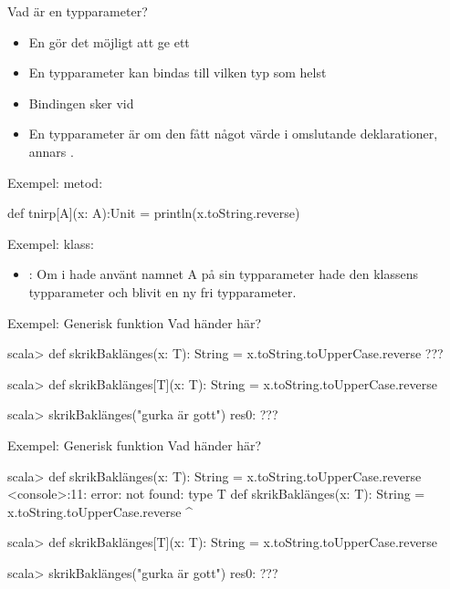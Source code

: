 \begin{Slide}{Vad är en typparameter?}\SlideFontSmall
\begin{itemize}
\item En  gör det möjligt att ge ett 
\item En  typparameter kan bindas till vilken typ som helst
\item Bindingen sker vid 
\item En typparameter är  om den  fått något värde i omslutande deklarationer, annars .
\end{itemize}
Exempel:  metod:
\begin{Code}
def tnirp[A](x: A):Unit = println(x.toString.reverse)
\end{Code}
\pause
Exempel:  klass:
\pause
\begin{itemize}
\item {}: Om  i  hade använt namnet A på sin typparameter hade den  klassens typparameter och blivit en ny fri typparameter.
\end{itemize}

\end{Slide}

\ifkompendium\else
\begin{Slide}{Exempel: Generisk funktion}
Vad händer här?
\begin{REPL}

scala> def skrikBaklänges(x: T): String = x.toString.toUpperCase.reverse
???



scala> def skrikBaklänges[T](x: T): String = x.toString.toUpperCase.reverse

scala> skrikBaklänges("gurka är gott")
res0: ???

\end{REPL}
\end{Slide}


\begin{Slide}{Exempel: Generisk funktion}
Vad händer här?
\begin{REPL}

scala> def skrikBaklänges(x: T): String = x.toString.toUpperCase.reverse
<console>:11: error: not found: type T
       def skrikBaklänges(x: T): String = x.toString.toUpperCase.reverse
                             ^

scala> def skrikBaklänges[T](x: T): String = x.toString.toUpperCase.reverse

scala> skrikBaklänges("gurka är gott")
res0: ???
\end{REPL}
\end{Slide}
\fi

